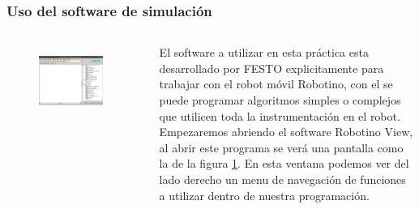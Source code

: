 \begin{frame}
	\frametitle{Uso del software de simulación}
	\begin{columns}
		\begin{figure}
			\begin{center}
				\includegraphics[width=0.9\textwidth]{images/00-inicio/01.png}
				\label{fig:inicio-01}
			\end{center}
		\end{figure}

		El software a utilizar en esta práctica esta desarrollado por FESTO explicitamente para trabajar con el robot móvil Robotino, con el se puede programar algoritmos simples o complejos que utilicen toda la instrumentación en el robot. Empezaremos abriendo el software Robotino View, al abrir este programa se verá una pantalla como la de la figura \ref{fig:inicio-01}. En esta ventana podemos ver del lado derecho un menu de navegación de funciones a utilizar dentro de nuestra programación.
	\end{columns}
\end{frame}

